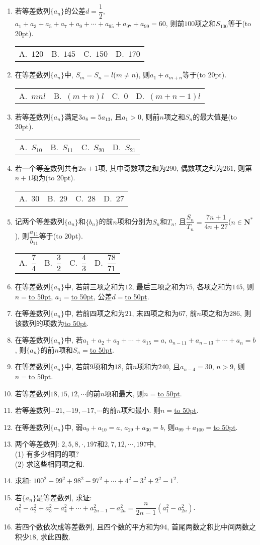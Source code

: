 \documentclass[10pt,a4paper]{article}
\newcommand{\blank}[1]{\underline{\hbox to #1pt{}}}
\newcommand{\bracket}[1]{(\hbox to #1pt{})}
\newcommand{\fourch}[4]{\par\begin{tabular}{p{.23\textwidth}p{.23\textwidth}p{.23\textwidth}p{.23\textwidth}}
A.~#1 &B.~#2& C.~#3& D.~#4
\end{tabular}}
\begin{document}
\begin{enumerate}[1.]
\item 若等差数列$\{a_n\}$的公差$d=\dfrac 12$, $a_1+a_3+a_5+a_7+a_9+\cdots +a_{95}+a_{97}+a_{99}=60$, 则前$100$项之和$S_{100}$等于\bracket{20}.
\fourch{$120$}{$145$}{$150$}{$170$}
\item 在等差数列$\{a_n\}$中, $S_m=S_n=l$($m\ne n$), 则$a_1+a_{m+n}$等于\bracket{20}.
\fourch{$mnl$}{$(m+n)l$}{$0$}{$(m+n-1)l$}
\item 若等差数列$\{a_n\}$满足$3a_8=5a_{13}$, 且$a_1>0$, 则前$n$项之和$S_n$的最大值是\bracket{20}.
\fourch{$S_{10}$}{$S_{11}$}{$S_{20}$}{$S_{21}$}
\item 若一个等差数列共有$2n+1$项, 其中奇数项之和为$290$, 偶数项之和为$261$, 则第$n+1$项为\bracket{20}.
\fourch{$30$}{$29$}{$28$}{$27$}
\item 记两个等差数列$\{a_n\}$和$\{b_n\}$的前$n$项和分别为$S_n$和$T_n$, 且$\dfrac{S_n}{T_n}=\dfrac{7n+1}{4n+27}$($n\in \mathbf{N}^*$), 则$\dfrac{a_{11}}{b_{11}}$等于\bracket{20}.
\fourch{$\dfrac 74$}{$\dfrac 32$}{$\dfrac 43$}{$\dfrac{78}{71}$}
\item 在等差数列$\{a_n\}$中, 若前三项之和为$12$, 最后三项之和为$75$, 各项之和为$145$, 则$n=$\blank{50}, $a_1=$\blank{50}, 公差$d=$\blank{50}.
\item 在等差数列$\{a_n\}$中, 若前四项之和为$21$, 末四项之和为$67$, 前$n$项之和为$286$, 则该数列的项数为\blank{50}.
\item 在等差数列$\{a_n\}$中, 若$a_1+a_2+a_3+\cdots +a_{15}=a$, $a_{n-11}+a_{n-13}+\cdots +a_n=b$, 则$\{a_n\}$的前$n$项和$S_n=$\blank{50}.
\item 在等差数列$\{a_n\}$中, 若前$9$项和为$18$, 前$n$项和为$240$, 且$a_{n-4}=30$, $n>9$, 则$n=$\blank{50}.
\item 若等差数列$18, 15, 12, \cdots$的前$n$项和最大, 则$n=$\blank{50}.
\item 若等差数列$-21, -19, -17, \cdots$的前$n$项和最小. 则$n=$\blank{50}.
\item 在等差数列$\{a_n\}$中, 弱$a_9+a_{10}=a$, $a_{29}+a_{30}=b$, 则$a_{99}+a_{100}=$\blank{50}.
\item 两个等差数列: $2, 5, 8, \cdot, 197$和$2, 7, 12, \cdots, 197$中,\\
(1) 有多少相同的项?\\
(2) 求这些相同项之和.
\item 求和: $100^2-99^2+98^2-97^2+\cdots +4^2-3^2+2^2-1^2$.
\item 若$\{a_n\}$是等差数列, 求证: $a_1^2-a_2^2+a_3^2-a_4^2+\cdots +a_{2n-1}^2-a_{2n}^2=\dfrac n{2n-1}(a_1^2-a_{2n}^2)$.
\item 若四个数依次成等差数列, 且四个数的平方和为$94$, 首尾两数之积比中间两数之积少$18$, 求此四数.

\end{enumerate}
\end{document}
